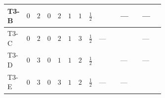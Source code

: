 \documentclass[8pt]{article}
\begin{document}
\begin{landscape}
\begin{longtable}{@{}llcccccc >{\raggedright\arraybackslash}p{0.21\linewidth} >{\raggedright\arraybackslash}p{0.21\linewidth} >{\raggedright\arraybackslash}p{0.21\linewidth}@{}}
\midrule
T3-B & $0$ & $2$ & $0$ & $2$ & $1$ & $1$ & $\frac{1}{2}$ & \scriptsize\adjustbox{max width=\linewidth}{$\begin{gathered} - \frac{\sqrt{3} i lambdaT_{3} \overline{y_{1}} \overline{y_{2}}}{3 MF}\end{gathered}$} & --- & --- \\
\midrule
T3-C & $0$ & $2$ & $0$ & $2$ & $1$ & $3$ & $\frac{1}{2}$ & --- & \scriptsize\adjustbox{max width=\linewidth}{$\begin{gathered} \frac{i lambdaT_{3} \overline{y_{1}} \overline{y_{2}}}{3 MF}\end{gathered}$} & --- \\
\midrule
T3-D & $0$ & $3$ & $0$ & $1$ & $1$ & $2$ & $\frac{1}{2}$ & \scriptsize\adjustbox{max width=\linewidth}{$\begin{gathered} - \frac{\sqrt{3} i lambdaT_{3} \overline{y_{1}} \overline{y_{2}}}{3 MF}\end{gathered}$} & --- & --- \\
\midrule
T3-E & $0$ & $3$ & $0$ & $3$ & $1$ & $2$ & $\frac{1}{2}$ & --- & --- & \scriptsize\adjustbox{max width=\linewidth}{$\begin{gathered} \frac{\sqrt{6} i lambdaT_{3} \overline{y_{1}} \overline{y_{2}}}{3 MF}\end{gathered}$} \\
\midrule
\bottomrule
\end{longtable}
\clearpage

\end{landscape}
\end{document}
